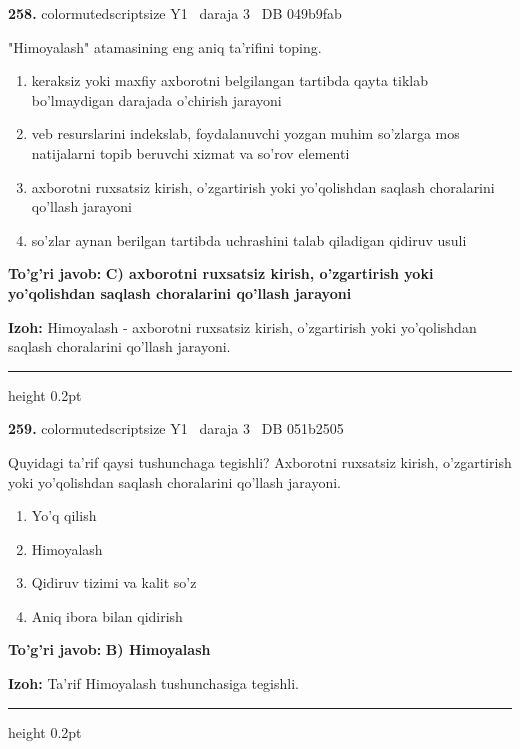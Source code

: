 \documentclass[10pt,a4paper,oneside]{article}
\begin{document}
\noindent\textbf{\color{ink}258.}  {color{muted}scriptsize Y1 \textbullet\ daraja 3 \textbullet\ DB 049b9fab}
\par
"Himoyalash" atamasining eng aniq ta'rifini toping.
\begin{enumerate}[label=\Alph*),leftmargin=9mm]
\item keraksiz yoki maxfiy axborotni belgilangan tartibda qayta tiklab bo'lmaydigan darajada o'chirish jarayoni
\item veb resurslarini indekslab, foydalanuvchi yozgan muhim so'zlarga mos natijalarni topib beruvchi xizmat va so'rov elementi
\item axborotni ruxsatsiz kirish, o'zgartirish yoki yo'qolishdan saqlash choralarini qo'llash jarayoni
\item so'zlar aynan berilgan tartibda uchrashini talab qiladigan qidiruv usuli
\end{enumerate}
\begin{tcolorbox}[enhanced,breakable,colback=teal!4,colframe=teal!50!black,boxrule=0.5pt,arc=1.1mm,left=3mm,right=3mm,top=1.7mm,bottom=1.7mm,before skip=2mm,after skip=2mm]
\textbf{\color{teal}To'g'ri javob:} \textbf{C) axborotni ruxsatsiz kirish, o'zgartirish yoki yo'qolishdan saqlash choralarini qo'llash jarayoni}
\par\smallskip
\textbf{Izoh:} Himoyalash - axborotni ruxsatsiz kirish, o'zgartirish yoki yo'qolishdan saqlash choralarini qo'llash jarayoni.
\end{tcolorbox}
\vspace{2mm}\hrule height 0.2pt \vspace{3mm}

\noindent\textbf{\color{ink}259.}  {color{muted}scriptsize Y1 \textbullet\ daraja 3 \textbullet\ DB 051b2505}
\par
Quyidagi ta'rif qaysi tushunchaga tegishli? Axborotni ruxsatsiz kirish, o'zgartirish yoki yo'qolishdan saqlash choralarini qo'llash jarayoni.
\begin{enumerate}[label=\Alph*),leftmargin=9mm]
\item Yo'q qilish
\item Himoyalash
\item Qidiruv tizimi va kalit so'z
\item Aniq ibora bilan qidirish
\end{enumerate}
\begin{tcolorbox}[enhanced,breakable,colback=teal!4,colframe=teal!50!black,boxrule=0.5pt,arc=1.1mm,left=3mm,right=3mm,top=1.7mm,bottom=1.7mm,before skip=2mm,after skip=2mm]
\textbf{\color{teal}To'g'ri javob:} \textbf{B) Himoyalash}
\par\smallskip
\textbf{Izoh:} Ta'rif Himoyalash tushunchasiga tegishli.
\end{tcolorbox}
\vspace{2mm}\hrule height 0.2pt \vspace{3mm}
\end{document}

